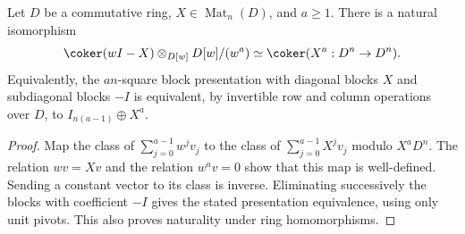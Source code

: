 \begin{lemma}
\label{lem:truncated-spectral-presentation}
Let \(D\) be a commutative ring, \(X\in\operatorname{Mat}_n(D)\),
and \(a\ge1\).  There is a natural isomorphism
\begin{equation}\label{eq:truncated-module-power}
 \coker(wI-X)\otimes_{D[w]}D[w]/(w^a)
                  \simeq \coker(X^a:D^n\to D^n).
\end{equation}
Equivalently, the \(an\)-square block presentation with diagonal
blocks \(X\) and subdiagonal blocks \(-I\) is equivalent, by
invertible row and column operations over \(D\), to
\(I_{n(a-1)}\oplus X^a\).
\end{lemma}
\begin{proof}
Map the class of \(\sum_{j=0}^{a-1}w^jv_j\) to the class of
\(\sum_{j=0}^{a-1}X^jv_j\) modulo \(X^aD^n\).
The relation \(wv=Xv\) and the relation \(w^av=0\) show that
this map is well-defined.  Sending a constant vector to its class
is inverse.  Eliminating successively the blocks with coefficient
\(-I\) gives the stated presentation equivalence, using only unit
pivots.  This also proves naturality under ring homomorphisms.
\end{proof}

